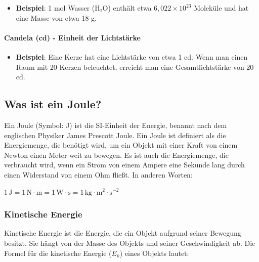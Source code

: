 \documentclass{vorlage-design-main}
\begin{document}
\begin{itemize}

\item
  \textbf{Beispiel}: 1 mol Wasser (H₂O) enthält etwa
  $6,022 \times 10^{23}$ Moleküle und hat eine Masse von etwa 18 g.
\end{itemize}

\hypertarget{candela-cd---einheit-der-lichtstuxe4rke}{%
\paragraph{Candela (cd) - Einheit der
Lichtstärke}\label{candela-cd---einheit-der-lichtstaerke}}

\begin{itemize}

\item
  \textbf{Beispiel}: Eine Kerze hat eine Lichtstärke von etwa 1 cd. Wenn
  man einen Raum mit 20 Kerzen beleuchtet, erreicht man eine
  Gesamtlichtstärke von 20 cd.
\end{itemize}

\hypertarget{was-ist-ein-joule}{%
\subsection{Was ist ein Joule?}\label{was-ist-ein-joule}}

Ein Joule (Symbol: J) ist die SI-Einheit der Energie, benannt nach dem
englischen Physiker James Prescott Joule. Ein Joule ist definiert als
die Energiemenge, die benötigt wird, um ein Objekt mit einer Kraft von
einem Newton einen Meter weit zu bewegen. Es ist auch die Energiemenge,
die verbraucht wird, wenn ein Strom von einem Ampere eine Sekunde lang
durch einen Widerstand von einem Ohm fließt. In anderen Worten:

$1 \, \text{J} = 1 \, \text{N} \cdot \text{m} = 1 \, \text{W} \cdot \text{s} = 1 \, \text{kg} \cdot \text{m}^2 \cdot \text{s}^{-2}$

\hypertarget{kinetische-energie}{%
\subsubsection{Kinetische Energie}\label{kinetische-energie}}

Kinetische Energie ist die Energie, die ein Objekt aufgrund seiner
Bewegung besitzt. Sie hängt von der Masse des Objekts und seiner
Geschwindigkeit ab. Die Formel für die kinetische Energie ($E_k$)
eines Objekts lautet:
\end{document}
